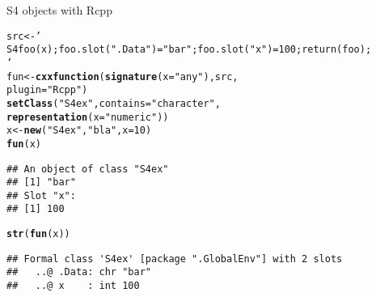 \documentclass{beamer}\usepackage[]{graphicx}\usepackage[]{color}
\makeatletter
\newcommand{\hlnum}[1]{\textcolor[rgb]{0.686,0.059,0.569}{#1}}%
\newcommand{\hlstr}[1]{\textcolor[rgb]{0.192,0.494,0.8}{#1}}%
\newcommand{\hlstd}[1]{\textcolor[rgb]{0.345,0.345,0.345}{#1}}%
\newcommand{\hlkwb}[1]{\textcolor[rgb]{0.69,0.353,0.396}{#1}}%
\newcommand{\hlkwc}[1]{\textcolor[rgb]{0.333,0.667,0.333}{#1}}%
\newcommand{\hlkwd}[1]{\textcolor[rgb]{0.737,0.353,0.396}{\textbf{#1}}}%
\newenvironment{kframe}{%
 \def\at@end@of@kframe{}%
 \ifinner\ifhmode%
  \def\at@end@of@kframe{\end{minipage}}%
  \begin{minipage}{\columnwidth}%
 \fi\fi%
 \def\FrameCommand##1{\hskip\@totalleftmargin \hskip-\fboxsep
 \colorbox{shadecolor}{##1}\hskip-\fboxsep
     \hskip-\linewidth \hskip-\@totalleftmargin \hskip\columnwidth}%
 \MakeFramed {\advance\hsize-\width
   \@totalleftmargin\z@ \linewidth\hsize
   \@setminipage}}%
 {\par\unskip\endMakeFramed%
 \at@end@of@kframe}
\newenvironment{knitrout}{}{} %
\makeatother
\begin{document}
\begin{frame}[fragile]{S4 objects with Rcpp}
\begin{knitrout}\footnotesize
{}\color{fgcolor}\begin{kframe}
\begin{alltt}
\hlstd{src} \hlkwb{<-} \hlstr{'
S4 foo(x) ; foo.slot(".Data") = "bar" ; foo.slot("x")=100; return(foo);
'}
\hlstd{fun} \hlkwb{<-} \hlkwd{cxxfunction}\hlstd{(}\hlkwd{signature}\hlstd{(}\hlkwc{x}\hlstd{=}\hlstr{"any"}\hlstd{), src,}
                   \hlkwc{plugin}\hlstd{=}\hlstr{"Rcpp"}\hlstd{)}
\hlkwd{setClass}\hlstd{(} \hlstr{"S4ex"}\hlstd{,} \hlkwc{contains} \hlstd{=} \hlstr{"character"}\hlstd{,}
         \hlkwd{representation}\hlstd{(} \hlkwc{x} \hlstd{=} \hlstr{"numeric"} \hlstd{) )}
\hlstd{x} \hlkwb{<-} \hlkwd{new}\hlstd{(} \hlstr{"S4ex"}\hlstd{,} \hlstr{"bla"}\hlstd{,} \hlkwc{x} \hlstd{=} \hlnum{10} \hlstd{)}
\hlkwd{fun}\hlstd{(x)}
\end{alltt}
\begin{verbatim}
## An object of class "S4ex"
## [1] "bar"
## Slot "x":
## [1] 100
\end{verbatim}
\begin{alltt}
\hlkwd{str}\hlstd{(}\hlkwd{fun}\hlstd{(x))}
\end{alltt}
\begin{verbatim}
## Formal class 'S4ex' [package ".GlobalEnv"] with 2 slots
##   ..@ .Data: chr "bar"
##   ..@ x    : int 100
\end{verbatim}
\end{kframe}
\end{knitrout}
\end{frame}
\end{document}
